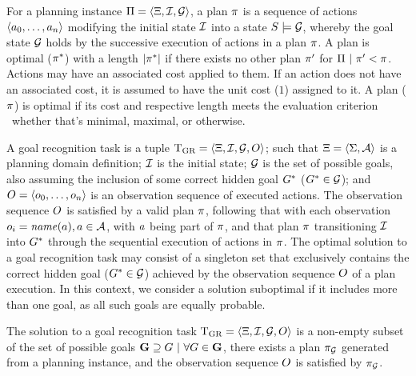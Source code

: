For a planning instance $\Pi=\left\langle\Xi,\mathcal{I},\mathcal{G}\right\rangle$, a plan $\pi$ is a sequence of actions $\left\langle a_0,\dots,a_n\right\rangle$ modifying the initial state $\mathcal{I}$ into a state $S\models\mathcal{G}$, whereby the goal state $\mathcal{G}$ holds by the successive execution of actions in a plan $\pi$. A plan is optimal ($\pi^{*}$) with a length $\vert\pi^{*}\vert$ if there exists no other plan $\pi'$ for $\Pi~\vert~ \pi'<\pi$.
Actions may have an associated cost applied to them. If an action does not have an associated cost, it is assumed to  have the unit cost ($1$) assigned to it. 
A plan ($\pi$) is optimal if its cost and respective length meets the evaluation criterion \textemdash~whether that's minimal, maximal, or otherwise.

A goal recognition task is a tuple $\text{T}_{\text{GR}}=\left\langle\Xi,\mathcal{I},\mathcal{G},O\right\rangle$; such that $\Xi=\left\langle\Sigma,\mathcal{A}\right\rangle$ is a planning domain definition; $\mathcal{I}$ is the initial state; $\mathcal{G}$ is the set of possible goals, also assuming the inclusion of some correct hidden goal $G^{*}$ ($G^{*}\in\mathcal{G}$); and $O=\left\langle o_0,\dots,o_n\right\rangle$ is an observation sequence of executed actions. The observation sequence $O$ is satisfied by a valid plan $\pi$, following that with each observation $o_i=\mathit{name}(a), a\in\mathcal{A}$, with $a$ being part of $\pi$, and that plan $\pi$ transitioning $\mathcal{I}$ into $G^{*}$ through the sequential execution of actions in $\pi$.
The optimal solution to a goal recognition task may consist of a singleton set that exclusively contains the correct hidden goal ($G^{*}\in\mathcal{G}$) achieved by the observation sequence $O$ of a plan execution.  In this context, we consider a solution suboptimal if it includes more than one goal, as all such goals are equally probable.

The solution to a goal recognition task $\text{T}_{\text{GR}}=\left\langle\Xi,\mathcal{I},\mathcal{G},O\right\rangle$ is a non-empty subset of the set of possible goals $\textbf{G}\supseteq G~\vert~\forall G\in\textbf{G}$, there exists a plan $\pi_{\mathcal{G}}$ generated from a planning instance, and the observation sequence $O$ is satisfied by $\pi_{\mathcal{G}}$.
